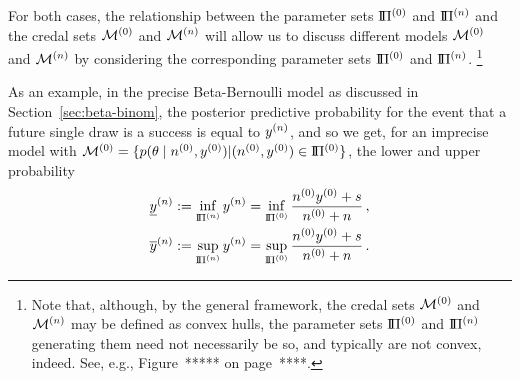 For both cases, the relationship between the parameter sets $\text{I}\!\Pi^{(0)}$ and $\text{I}\!\Pi^{(n)}$ and the credal sets $\mathcal{M}^{(0)}$ and $\mathcal{M}^{(n)}$
will allow us to discuss different models $\mathcal{M}^{(0)}$ and $\mathcal{M}^{(n)}$
by considering the corresponding parameter sets $\text{I}\!\Pi^{(0)}$ and $\text{I}\!\Pi^{(n)}$.%
\footnote{Note that, although, by the general framework, the credal sets $\mathcal{M}^{(0)}$ and $\mathcal{M}^{(n)}$ may be defined as convex hulls,
the parameter sets $\text{I}\!\Pi^{(0)}$ and $\text{I}\!\Pi^{(n)}$ generating them need not necessarily be so, and typically are not convex, indeed.
See, e.g., Figure~***** on page~****.}


As an example, in the precise Beta-Bernoulli model as discussed in Section~\ref{sec:beta-binom},
the posterior predictive probability %
for the event that a future single draw is a success is equal to $y^{(n)}$, and so we get,
for an imprecise model with $\mathcal{M}^{(0)} = \{p(\theta\mid n^{(0)}, y^{(0)}) \vert (n^{(0)}, y^{(0)}) \in \text{I}\!\Pi^{(0)}\}$,
the lower and upper probability
\begin{align*}
\underline{y}^{(n)} &:= \inf_{\text{I}\!\Pi^{(n)}} y^{(n)} = \inf_{\text{I}\!\Pi^{(0)}} \frac{n^{(0)}y^{(0)} + s}{n^{(0)} +n}\,, \\
\overline{y}^{(n)} &:= \sup_{\text{I}\!\Pi^{(n)}} y^{(n)} = \sup_{\text{I}\!\Pi^{(0)}} \frac{n^{(0)}y^{(0)} + s}{n^{(0)} +n}\,.
\end{align*}

